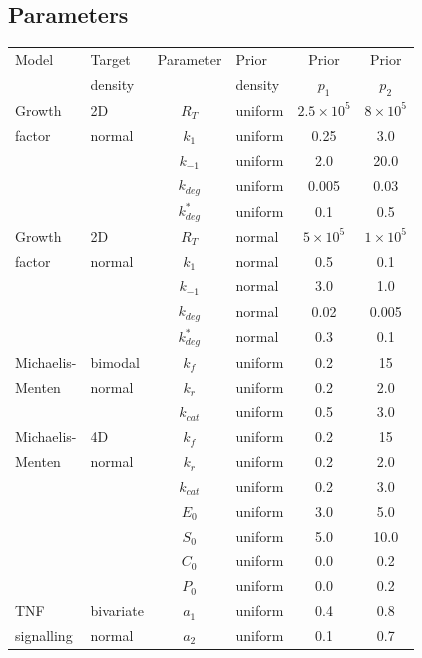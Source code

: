 \subsection{Parameters}
\label{sec:parameters}
\begin{table}[htbp]
\centering
\begin{adjustwidth}{0in}{0in}%
\begin{tabularx}{1.0\textwidth}{llclcc}
Model	& Target  & Parameter & Prior    & Prior  & Prior  \\
        & density &           & density  & $p_1$  & $p_2$  \\
\toprule
Growth  & 2D     & $R_T$       & uniform & $2.5 \times 10^5$ &  $8 \times 10^5$\\
factor  & normal & $k_1$       & uniform & 0.25 & 3.0\\
                && $k_{-1}$    & uniform & 2.0 & 20.0\\
                && $k_{deg}$   & uniform & 0.005 & 0.03\\
                && $k^*_{deg}$ & uniform & 0.1 & 0.5\\
\toprule
Growth  & 2D     & $R_T$ & normal & $5 \times 10^5$ &  $1 \times 10^5$\\
factor  & normal & $k_1$ & normal & 0.5 & 0.1\\
                && $k_{-1}$ & normal & 3.0 & 1.0\\
                && $k_{deg}$ & normal & 0.02 & 0.005\\
                && $k^*_{deg}$ & normal & 0.3 & 0.1\\
\toprule
Michaelis- & bimodal  & $k_f$ & uniform & 0.2 &  15\\
Menten     & normal   & $k_r$ & uniform & 0.2 & 2.0\\
&& $k_{cat}$ & uniform & 0.5 & 3.0\\
\toprule
Michaelis- & 4D    & $k_f$ & uniform & 0.2 &  15\\
Menten     & normal& $k_r$ & uniform & 0.2 & 2.0\\
&& $k_{cat}$ & uniform & 0.2 & 3.0\\
&& $E_0$ & uniform & 3.0 & 5.0\\
&& $S_0$ & uniform & 5.0 & 10.0\\
&& $C_0$ & uniform & 0.0 & 0.2\\
&& $P_0$ & uniform & 0.0 & 0.2\\
\toprule
TNF & bivariate & $a_1$ & uniform & 0.4 & 0.8\\
signalling & normal& $a_2$ & uniform & 0.1 & 0.7\\

\end{tabularx}
\end{adjustwidth}
\end{table}
